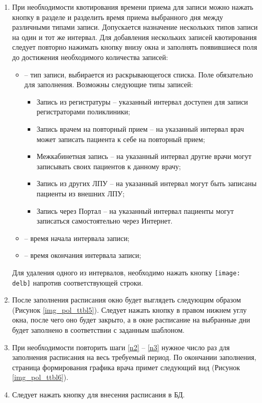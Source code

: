 {\begin{enumerate}
 \item При необходимости квотирования времени приема для записи можно нажать кнопку  в разделе  и разделить время приема выбранного дня между различными типами записи. Допускается назначение нескольких типов записи на один и тот же интервал. Для добавления нескольких записей квотирования следует повторно нажимать кнопку  внизу окна и заполнять появившиеся поля до достижения необходимого количества записей:
 \begin{itemize}
 	\item {} -- тип записи, выбирается из раскрывающегося списка. Поле обязательно для заполнения. Возможны следующие типы записей: 
 	\begin{itemize}
 		\item Запись из регистратуры -- указанный интервал доступен для записи регистраторами поликлиники;
 		\item Запись врачем на повторный прием -- на указанный интервал врач может записать пациента к себе на повторный прием;
 		\item Межкабинетная запись -- на указанный интервал другие врачи могут записывать своих пациентов к данному врачу;
 		\item Запись из других ЛПУ -- на указанный интервал могут быть записаны пациенты из внешних ЛПУ;
 		\item Запись через Портал -- на указанный интервал пациенты могут записаться самостоятельно через Интернет.		
 	\end{itemize}
 	\item {} -- время начала интервала записи;
 	\item {} -- время окончания интервала записи;	
 \end{itemize}
 Для удаления одного из интервалов, необходимо нажать кнопку \texttt{[image: delb]} напротив соответствующей строки. 
 
 \item \label{n3} После заполнения расписания окно будет выглядеть следующим образом (Рисунок \ref{img_pol_ttbl5}). Следует нажать кнопку  в правом нижнем углу окна, после чего оно будет закрыто, а в окне  расписание на выбранные дни будет заполнено в соответствии с заданным шаблоном. 
 \item При необходимости повторить шаги \ref{n2} -- \ref{n3} нужное число раз для заполнения расписания на весь требуемый период. По окончании заполнения, страница формирования графика врача примет следующий вид (Рисунок \ref{img_pol_ttbl6}). 
 \item Следует нажать кнопку  для внесения расписания в БД. 
\end{enumerate}

}
